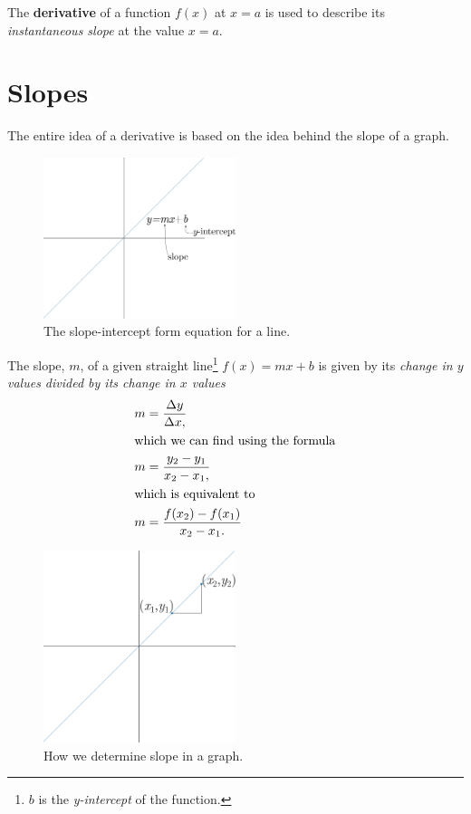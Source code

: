 The \textbf{derivative} of a function $f(x)$ at $x=a$ is used to describe its \emph{instantaneous slope} at the value $x=a$.

\section{Slopes}
The entire idea of a derivative is based on the idea behind the slope of a graph.
\begin{figure}[H]
  \begin{center}
    \includegraphics[width=0.5\textwidth]{continuous/derivatives/lineform.eps}
  \end{center}
  \caption{The slope-intercept form equation for a line.}
\end{figure}
The slope, $m$, of a given straight line\footnote{$b$ is the \emph{y-intercept} of the function.}
$f(x)=mx+b$ is given by its \emph{change in $y$ values divided by its change in $x$ values}
\begin{align}
  \label{eq:slope}
  m&=\frac{\Delta y}{\Delta x,} \\
  \intertext{which we can find using the formula}
  m&=\frac{y_2-y_1}{x_2-x_1,} \\
  \intertext{which is equivalent to}
  m&=\frac{f(x_2)-f(x_1)}{x_2-x_1.}
\end{align}
\begin{figure}[H]
  \begin{center}
    \includegraphics[width=0.5\textwidth]{continuous/derivatives/lineform_slope.eps}
  \end{center}
  \caption{How we determine slope in a graph.}
\end{figure}
